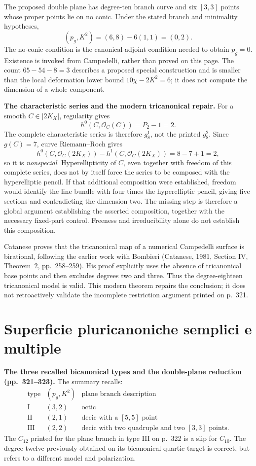 The proposed double plane has degree-ten branch curve and six \([3,3]\) points whose proper points lie on no conic. Under the stated branch and minimality hypotheses,
\[
(p_g,K^2)=(6,8)-6(1,1)=(0,2).
\]
The no-conic condition is the canonical-adjoint condition needed to obtain \(p_g=0\). Existence is invoked from Campedelli, rather than proved on this page. The count \(65-54-8=3\) describes a proposed special construction and is smaller than the local deformation lower bound \(10\chi-2K^2=6\); it does not compute the dimension of a whole component.

\textbf{The characteristic series and the modern tricanonical repair.}
For a smooth \(C\in|2K_X|\), regularity gives
\[
h^0(C,\mathcal O_C(C))=P_2-1=2.
\]
The complete characteristic series is therefore \(g^1_8\), not the printed \(g^2_8\). Since \(g(C)=7\), curve Riemann--Roch gives
\[
h^0(C,\mathcal O_C(2K_X))-h^1(C,\mathcal O_C(2K_X))
=8-7+1=2,
\]
so it is \emph{nonspecial}. Hyperellipticity of \(C\), even together with freedom of this complete series, does not by itself force the series to be composed with the hyperelliptic pencil. If that additional composition were established, freedom would identify the line bundle with four times the hyperelliptic pencil, giving five sections and contradicting the dimension two. The missing step is therefore a global argument establishing the asserted composition, together with the necessary fixed-part control. Freeness and irreducibility alone do not establish this composition.

Catanese proves that the tricanonical map of a numerical Campedelli surface is birational, following the earlier work with Bombieri (Catanese, 1981, Section IV, Theorem~2, pp.~258--259). His proof explicitly uses the absence of tricanonical base points and then excludes degrees two and three. Thus the degree-eighteen tricanonical model is valid. This modern theorem repairs the conclusion; it does not retroactively validate the incomplete restriction argument printed on p.~321.

\section{Superficie pluricanoniche semplici e multiple}
\label{cp2-viii-21}

\textbf{The three recalled bicanonical types and the double-plane reduction (pp.~321--323).}
The summary recalls:
\[
\begin{array}{c|c|c}
\text{type}&(p_g,K^2)&\text{plane branch description}\\ \hline
\mathrm I&(3,2)&\text{octic}\\
\mathrm{II}&(2,1)&\text{decic with a }[5,5]\text{ point}\\
\mathrm{III}&(2,2)&\text{decic with two quadruple and two }[3,3]\text{ points}.
\end{array}
\]
The \(C_{12}\) printed for the plane branch in type III on p.~322 is a slip for \(C_{10}\). The degree twelve previously obtained on its bicanonical quartic target is correct, but refers to a different model and polarization.

